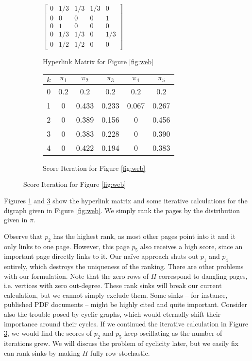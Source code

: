 \documentclass[../exploring-pagerank.tex]{subfiles}
\begin{document}
    \begin{figure}[t!]
        \centering
        \begin{subfigure}
            \centering
            $\begin{bmatrix}
                0 & 1/3 & 1/3 & 1/3 & 0 \\
                0 & 0 & 0 & 0 & 1 \\
                0 & 1 & 0 & 0 & 0 \\
                0 & 1/3 & 1/3 & 0 & 1/3 \\
                0 & 1/2 & 1/2 & 0 & 0
            \end{bmatrix}$
            \caption{Hyperlink Matrix for Figure \ref{fig:web}}
            \label{fig:hyperlink}
        \end{subfigure}
        \vspace{2em}
        \begin{subfigure}
        \centering
        \begin{tabular}{|c||c|c|c|c|c|}
             \hline
             $k$ & $\pi_1$ & $\pi_2$ & $\pi_3$ & $\pi_4$ & $\pi_5$ \\
             \hline\hline
             0 & 0.2 & 0.2 & 0.2 & 0.2 & 0.2 \\
             1 & 0 & 0.433 & 0.233 & 0.067 & 0.267 \\
             2 & 0 & 0.389 & 0.156 & 0 & 0.456 \\
             3 & 0 & 0.383 & 0.228 & 0 & 0.390 \\
             4 & 0 & 0.422 & 0.194 & 0 & 0.383 \\
             \hline
        \end{tabular}
        \caption{Score Iteration for Figure \ref{fig:web}}
        \label{fig:example_calculation}
        \end{subfigure}
    \end{figure}
    Figures \ref{fig:hyperlink} and \ref{fig:example_calculation} show the hyperlink matrix and some iterative calculations for the digraph given in Figure \ref{fig:web}. We simply rank the pages by the distribution given in $\pi$.

    Observe that $p_2$ has the highest rank, as most other pages point into it and it only links to one page. However, this page $p_5$ also receives a high score, since an important page directly links to it. Our na{\"i}ve approach shuts out $p_1$ and $p_4$ entirely, which destroys the uniqueness of the ranking. There are other problems with our formulation. Note that the zero rows of $H$ correspond to dangling pages, i.e. vertices with zero out-degree. These rank sinks will break our current calculation, but we cannot simply exclude them. Some sinks -- for instance, published PDF documents -- might be highly cited and quite important. Consider also the trouble posed by cyclic graphs, which would eternally shift their importance around their cycles. If we continued the iterative calculation in Figure \ref{fig:example_calculation}, we would find the scores of $p_2$ and $p_5$ keep oscillating as the number of iterations grew. We will discuss the problem of cyclicity later, but we easily fix can rank sinks by making $H$ fully row-stochastic.
\end{document}
